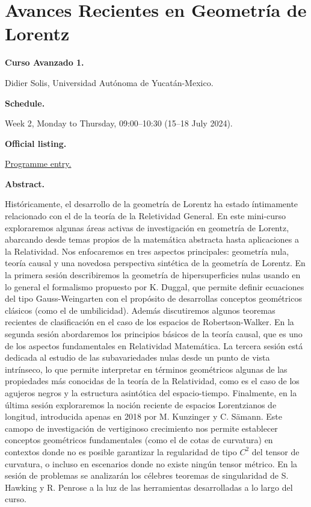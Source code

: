 \section{Avances Recientes en Geometría de
Lorentz}
\label{section-solis-lorentzian-geometry}

\medskip\noindent
{\bf Curso Avanzado 1.}

Didier Solis,
Universidad Autónoma de Yucatán-Mexico.

\medskip\noindent
{\bf Schedule.}

Week 2, Monday to Thursday, 09:00--10:30
(15--18 July 2024).

\medskip\noindent
{\bf Official listing.}

\href{%
https://naturales.ues.edu.sv/%
ecimpasv2024/advanced-curse-1/}{%
Programme entry.}

\medskip\noindent
{\bf Abstract.}

Históricamente, el desarrollo de la geometría
de Lorentz ha estado íntimamente relacionado
con el de la teoría de la Reletividad
General. En este mini-curso exploraremos
algunas áreas activas de investigación en
geometría de Lorentz, abarcando desde temas
propios de la matemática abstracta hasta
aplicaciones a la Relatividad. Nos
enfocaremos en tres aspectos principales:
geometría nula, teoría causal y una novedosa
perspectiva sintética de la geometría de
Lorentz. En la primera sesión describiremos
la geometría de hipersuperficies nulas usando
en lo general el formalismo propuesto por K.
Duggal, que permite definir ecuaciones del
tipo Gauss-Weingarten con el propósito de
desarrollas conceptos geométricos clásicos
(como el de umbilicidad). Además discutiremos
algunos teoremas recientes de clasificación
en el caso de los espacios de
Robertson-Walker. En la segunda sesión
abordaremos los principios básicos de la
teoría causal, que es uno de los aspectos
fundamentales en Relatividad Matemática. La
tercera sesión está dedicada al estudio de
las subavariedades nulas desde un punto de
vista intrínseco, lo que permite interpretar
en términos geométricos algunas de las
propiedades más conocidas de la teoría de la
Relatividad, como es el caso de los agujeros
negros y la estructura asintótica del
espacio-tiempo. Finalmente, en la última
sesión exploraremos la noción reciente de
espacios Lorentzianos de longitud,
introducida apenas en 2018 por M. Kunzinger y
C. Sämann. Este camopo de investigación de
vertiginoso crecimiento nos permite
establecer conceptos geométricos
fundamentales (como el de cotas de curvatura)
en contextos donde no es posible garantizar
la regularidad de tipo $C^2$ del tensor de
curvatura, o incluso en escenarios donde no
existe ningún tensor métrico. En la sesión de
problemas se analizarán los célebres teoremas
de singularidad de S. Hawking y R. Penrose a
la luz de las herramientas desarrolladas a lo
largo del curso.

